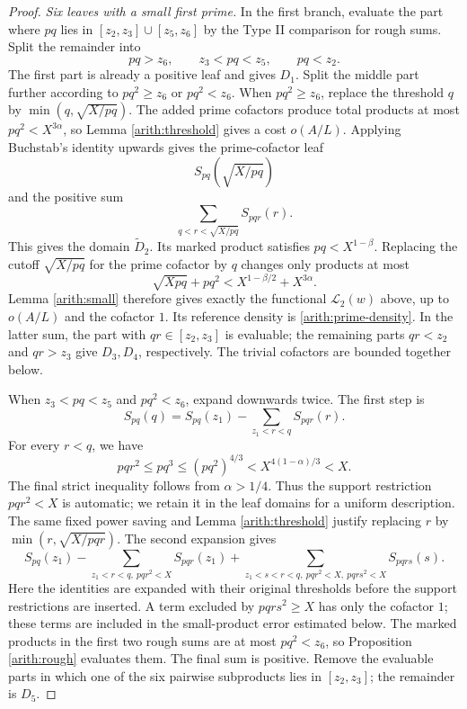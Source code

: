 \documentclass[11pt,a4paper]{article}
\theoremstyle{paperplain}
\numberwithin{equation}{section}
\begin{document}
\begin{proof}
\smallskip\noindent\emph{Six leaves with a small first prime.}\quad
In the first branch, evaluate the part where
$pq$ lies in $[z_2,z_3]\cup[z_5,z_6]$ by the Type II comparison for rough
sums. Split the remainder into
\[
 pq>z_6,\qquad z_3<pq<z_5,\qquad pq<z_2.
\]
The first part is already a positive leaf and gives $D_1$.
Split the middle part further according to $pq^2\ge z_6$ or
$pq^2<z_6$.
When $pq^2\ge z_6$, replace the threshold $q$ by
$\min(q,\sqrt{X/pq})$.
The added prime cofactors produce total products at most
$pq^2<X^{3\alpha}$, so Lemma \ref{arith:threshold} gives a cost
$o(A/L)$.
Applying Buchstab's identity upwards gives the prime-cofactor leaf
\[
 S_{pq}(\sqrt{X/pq})
\]
and the positive sum
\[
 \sum_{q<r<\sqrt{X/pq}}S_{pqr}(r).
\]
This gives the domain $\widetilde D_2$.
Its marked product satisfies $pq<X^{1-\beta}$.
Replacing the cutoff $\sqrt{X/pq}$ for the prime cofactor by $q$
changes only products at most
\[
 \sqrt{Xpq}+pq^2<X^{1-\beta/2}+X^{3\alpha}.
\]
Lemma \ref{arith:small} therefore gives exactly the functional
$\mathcal L_2(w)$ above, up to $o(A/L)$ and the cofactor $1$.
Its reference density is \eqref{arith:prime-density}.
In the latter sum, the part with $qr\in[z_2,z_3]$ is evaluable;
the remaining parts $qr<z_2$ and $qr>z_3$ give $D_3,D_4$,
respectively.
The trivial cofactors are bounded together below.

When $z_3<pq<z_5$ and $pq^2<z_6$, expand downwards twice.
The first step is
\[
 S_{pq}(q)=S_{pq}(z_1)-\sum_{z_1<r<q}S_{pqr}(r).
\]
For every $r<q$, we have
\[
 pqr^2\le pq^3\le(pq^2)^{4/3}<X^{4(1-\alpha)/3}<X.
\]
The final strict inequality follows from $\alpha>1/4$.
Thus the support restriction $pqr^2<X$ is automatic; we retain it
in the leaf domains for a uniform description.
The same fixed power saving and Lemma \ref{arith:threshold}
justify replacing $r$ by $\min(r,\sqrt{X/pqr})$.
The second expansion gives
\[
 S_{pq}(z_1)-\sum_{z_1<r<q,\ pqr^2<X}S_{pqr}(z_1)
 +\sum_{z_1<s<r<q,\ pqr^2<X,\ pqrs^2<X}S_{pqrs}(s).
\]
Here the identities are expanded with their original thresholds before
the support restrictions are inserted. A term excluded by $pqrs^2\ge X$
has only the cofactor $1$; these terms are included in the small-product
error estimated below.
The marked products in the first two rough sums are at most
$pq^2<z_6$, so Proposition \ref{arith:rough} evaluates them.
The final sum is positive.
Remove the evaluable parts in which one of the six pairwise
subproducts lies in $[z_2,z_3]$; the remainder is $D_5$.


\end{proof}
\end{document}
